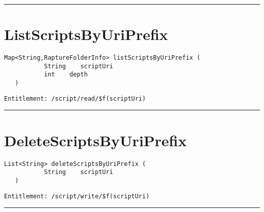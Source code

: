 \rule{12cm}{2pt}
\section{ListScriptsByUriPrefix}
\label{Api:ListScriptsByUriPrefix}
\begin{lstlisting}[style=nonumbers]
   Map<String,RaptureFolderInfo> listScriptsByUriPrefix (
           String    scriptUri
           int    depth
   )
\end{lstlisting}
\begin{Verbatim}[formatcom=\color{Maroon}]
  Entitlement: /script/read/$f(scriptUri)
\end{Verbatim}



\rule{12cm}{2pt}
\section{DeleteScriptsByUriPrefix}
\label{Api:DeleteScriptsByUriPrefix}
\begin{lstlisting}[style=nonumbers]
   List<String> deleteScriptsByUriPrefix (
           String    scriptUri
   )
\end{lstlisting}
\begin{Verbatim}[formatcom=\color{Maroon}]
  Entitlement: /script/write/$f(scriptUri)
\end{Verbatim}



\rule{12cm}{2pt}
